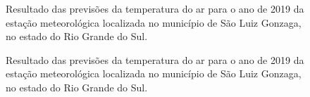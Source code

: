 \begin{figure}[H]%
\caption{Resultado das previsões da temperatura do ar para o ano de 2019 da estação meteorológica localizada no município de São Luiz Gonzaga, no estado do Rio Grande do Sul.}
\centering
{}
\qquad
{}
\label{fig:results_arima_A826}%
\end{figure}

\begin{figure}[H]%
\caption{Resultado das previsões da temperatura do ar para o ano de 2019 da estação meteorológica localizada no município de São Luiz Gonzaga, no estado do Rio Grande do Sul.}
\centering
{}
\qquad
{}
\label{fig:MFL}%
\end{figure}